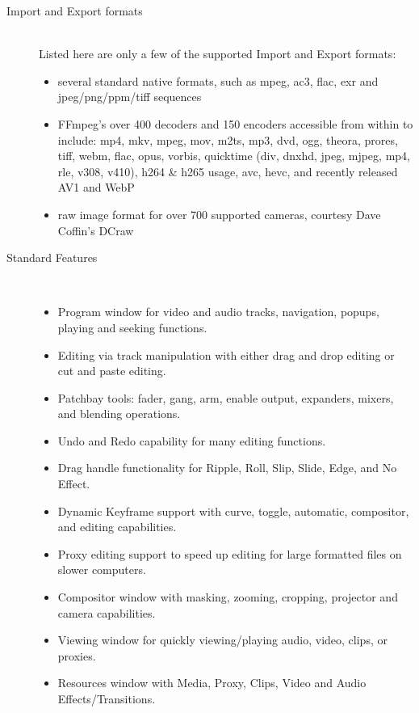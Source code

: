 \begin{description}
    \item[Import and Export formats]~\\
        Listed here are only a few of the supported Import and Export formats:
        \begin{itemize}
            \item  several standard native formats, such as mpeg, ac3, flac, exr and jpeg/png/ppm/tiff sequences
            \item FFmpeg’s over 400 decoders and 150 encoders accessible from within \CGG{} to include:
                mp4, mkv, mpeg, mov, m2ts, mp3, dvd, ogg, theora, prores, tiff, webm, flac, opus, vorbis,
                quicktime (div, dnxhd, jpeg, mjpeg, mp4, rle, v308, v410), h264 \& h265 usage, avc, hevc,
                and recently released AV1 and WebP
            \item raw image format for over 700 supported cameras, courtesy Dave Coffin's DCraw
        \end{itemize}
        \item[Standard Features]~\\
            \begin{itemize}
                \item Program window for video and audio tracks, navigation, popups, playing and seeking functions.
                \item Editing via track manipulation with either drag and drop editing or cut and paste editing.
                \item  Patchbay tools: fader, gang, arm, enable output, expanders, mixers, and blending operations.
                \item Undo and Redo capability for many editing functions.
                \item Drag handle functionality for Ripple, Roll, Slip, Slide, Edge, and No Effect.
                \item Dynamic Keyframe support with curve, toggle, automatic, compositor, and editing capabilities.
                \item Proxy editing support to speed up editing for large formatted files on slower computers.
                \item Compositor window with masking, zooming, cropping, projector and camera capabilities.
                \item Viewing window for quickly viewing/playing audio, video, clips, or proxies.
                \item Resources window with Media, Proxy, Clips, Video and Audio Effects/Transitions.

\end{itemize}
\end{description}
